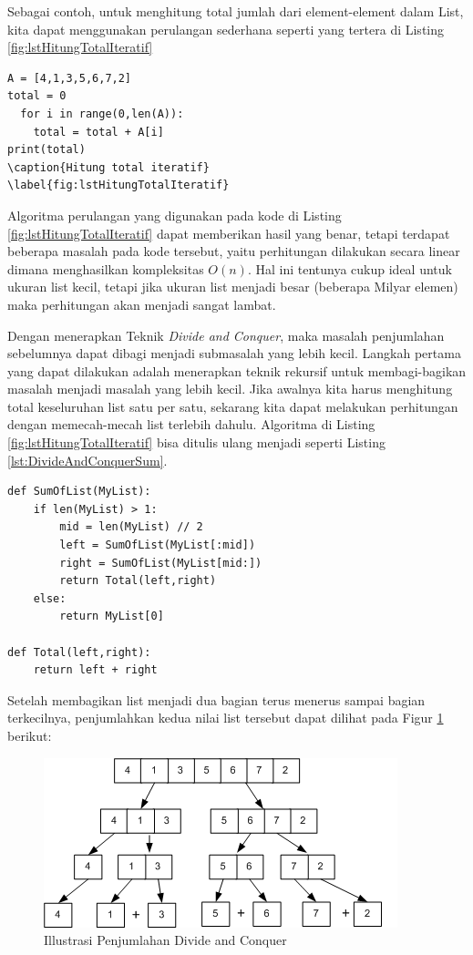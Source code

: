 Sebagai contoh, untuk menghitung total jumlah dari element-element dalam List, kita dapat menggunakan perulangan sederhana seperti yang tertera di Listing \ref{fig:lstHitungTotalIteratif}



\lstset{language=Python}
\begin{lstlisting}[frame=single]
A = [4,1,3,5,6,7,2]
total = 0
  for i in range(0,len(A)):
    total = total + A[i]
print(total)
\caption{Hitung total iteratif}
\label{fig:lstHitungTotalIteratif}
\end{lstlisting}

Algoritma perulangan yang digunakan pada kode di Listing \ref{fig:lstHitungTotalIteratif} dapat memberikan hasil yang benar, tetapi terdapat beberapa masalah pada kode tersebut, yaitu perhitungan dilakukan secara linear dimana menghasilkan kompleksitas $O(n)$. Hal ini tentunya cukup ideal untuk ukuran list kecil, tetapi jika ukuran list menjadi besar (beberapa Milyar elemen) maka perhitungan akan menjadi sangat lambat.

Dengan menerapkan Teknik \textit{Divide and Conquer}, maka masalah penjumlahan sebelumnya dapat dibagi menjadi submasalah yang lebih kecil. Langkah pertama yang dapat dilakukan adalah menerapkan teknik rekursif untuk membagi-bagikan masalah menjadi masalah yang lebih kecil. Jika awalnya kita harus menghitung total keseluruhan list satu per satu, sekarang kita dapat melakukan perhitungan dengan memecah-mecah list terlebih dahulu. Algoritma di Listing \ref{fig:lstHitungTotalIteratif} bisa ditulis ulang menjadi seperti Listing \ref{lst:DivideAndConquerSum}.

\lstset{language=Python}
\label{lst:DivideAndConquerSum}
\begin{lstlisting}[frame=single]
def SumOfList(MyList):
    if len(MyList) > 1:
        mid = len(MyList) // 2
        left = SumOfList(MyList[:mid])
        right = SumOfList(MyList[mid:])
        return Total(left,right)
    else:
        return MyList[0]

def Total(left,right):
    return left + right
\end{lstlisting}

Setelah membagikan list menjadi dua bagian terus menerus sampai bagian terkecilnya, penjumlahkan kedua nilai list tersebut dapat dilihat pada Figur \ref{fig:DivideAndConquerSum} berikut:

\begin{figure}[htbp]
\begin{center}
	\includegraphics[scale=0.7]{fig/sunario-3/Sum.png}%
	\caption{Illustrasi Penjumlahan Divide and Conquer}%
	\label{fig:DivideAndConquerSum}%
\end{center}
\end{figure}

